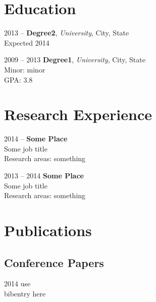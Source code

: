 \documentclass{cvjoe}
\begin{document}
\header

\section{Education}

\begin{cvlist}
    \item[2013 -- ]
        {\bf Degree2}, \emph{University}, City, State \\
        Expected 2014
    \item[2009 -- 2013]
        {\bf Degree1}, \emph{University}, City, State \\
        Minor: minor \\
        GPA: 3.8 
\end{cvlist}

\section{Research Experience}

\begin{cvlist}
    \item[2014 -- ]
        \textbf{Some Place} \\
        Some job title \\
        Research areas: something
    \item[2013 -- 2014]
        \textbf{Some Place} \\
        Some job title \\
        Research areas: something
\end{cvlist}

\section{Publications}

%

\subsection{Conference Papers}

\begin{cvlist}
    \item[2014] use \\bibentry here %
\end{cvlist}
\end{document}
